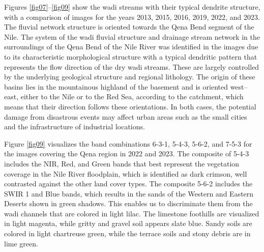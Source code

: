 \documentclass[information,article,accept,pdftex,moreauthors]{Definitions/mdpi}
\begin{document}
Figures \ref{fig07}--\ref{fig09} show the wadi streams with their typical dendrite structure, with a comparison of images for {the years }2013, 2015, 2016, 2019, 2022, and 2023. The fluvial network structure is oriented towards the Qena Bend segment of the Nile. The system of the wadi fluvial structure and drainage stream network in the surroundings of the Qena Bend of the Nile River was identified in the images due to {its }characteristic morphological structure {with a }typical dendritic pattern that represents the flow direction of the dry wadi streams. These are largely controlled by the underlying geological structure and regional lithology. The origin of these basins lies in {the }mountainous highland of the basement and is oriented west--east, either to the Nile or to the Red Sea, according to the catchment, {which means that }their direction follows these orientations. In both cases, the potential damage from  disastrous events may affect urban areas such as the small cities and {the infrastructure of industrial locations}. 


Figure \ref{fig09} visualizes the band combinations {6-3-1, 5-4-3, 5-6-2, and 7-5-3} for the images covering the Qena region in 2022 and 2023. The composite of {5-4-3 }includes the NIR, Red, and Green bands that best represent the vegetation coverage in the Nile River floodplain, which is identified as dark crimson, well {contrasted }against the other land cover types. The composite 5-6-2 includes the SWIR 1 and Blue bands, which results in the sands of the Western and Eastern Deserts shown in green shadows. This enables us to discriminate them from the wadi channels that are colored in light lilac. The limestone foothills are visualized in light magenta, while gritty and gravel soil appears slate blue. Sandy soils are colored in light chartreuse green, while the terrace soils and stony debris are in lime green.
\end{document}
